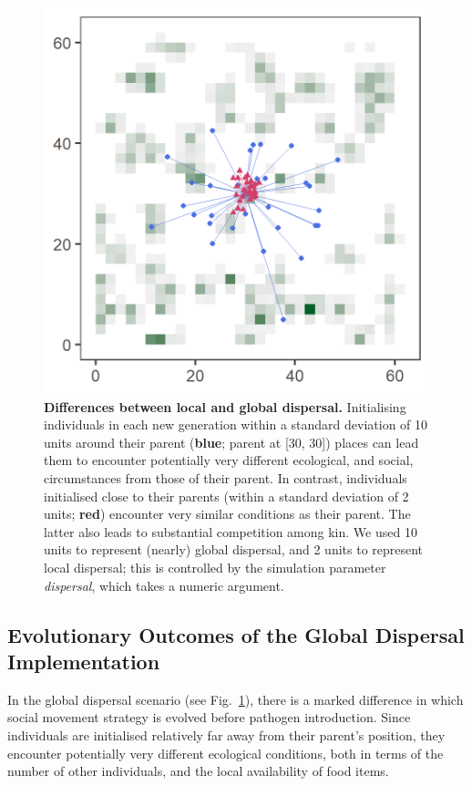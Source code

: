 \begin{figure}
    \centering
    \includegraphics{figures/pathomove/fig_global_dispersal.png}
    \caption{
        \textbf{Differences between local and global dispersal.} 
        Initialising individuals in each new generation within a standard deviation of 10 units around their parent (\textbf{blue}; parent at [30, 30]) places can lead them to encounter potentially very different ecological, and social, circumstances from those of their parent. In contrast, individuals initialised close to their parents (within a standard deviation of 2 units; \textbf{red}) encounter very similar conditions as their parent. The latter also leads to substantial competition among kin. We used 10 units to represent (nearly) global dispersal, and 2 units to represent local dispersal; this is controlled by the simulation parameter \emph{dispersal}, which takes a numeric argument.
    }\label{fig:patho_dispersal}
\end{figure}

\subsection*{Evolutionary Outcomes of the Global Dispersal Implementation}

In the global dispersal scenario (see Fig.~\ref{fig:patho_dispersal}), there is a marked difference in which social movement strategy is evolved before pathogen introduction.
Since individuals are initialised relatively far away from their parent's position, they encounter potentially very different ecological conditions, both in terms of the number of other individuals, and the local availability of food items.

